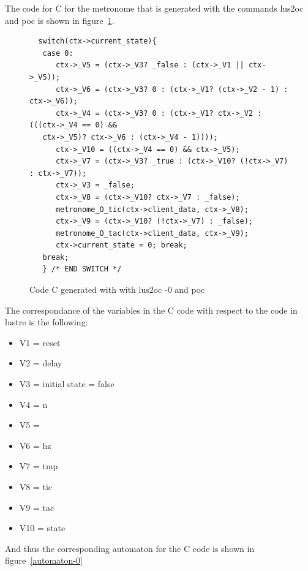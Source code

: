 \documentclass{article}
\begin{document}
The code for C for the metronome that is generated with the commands
lus2oc and poc is shown in figure~\ref{metronome-0}.


\begin{figure}[ht]

\begin{verbatim}
  switch(ctx->current_state){
   case 0:
      ctx->_V5 = (ctx->_V3? _false : (ctx->_V1 || ctx->_V5));
      ctx->_V6 = (ctx->_V3? 0 : (ctx->_V1? (ctx->_V2 - 1) : ctx->_V6));
      ctx->_V4 = (ctx->_V3? 0 : (ctx->_V1? ctx->_V2 : (((ctx->_V4 == 0) &&
   ctx->_V5)? ctx->_V6 : (ctx->_V4 - 1))));
      ctx->_V10 = ((ctx->_V4 == 0) && ctx->_V5);
      ctx->_V7 = (ctx->_V3? _true : (ctx->_V10? (!ctx->_V7) : ctx->_V7));
      ctx->_V3 = _false;
      ctx->_V8 = (ctx->_V10? ctx->_V7 : _false);
      metronome_O_tic(ctx->client_data, ctx->_V8);
      ctx->_V9 = (ctx->_V10? (!ctx->_V7) : _false);
      metronome_O_tac(ctx->client_data, ctx->_V9);
      ctx->current_state = 0; break;
   break;
   } /* END SWITCH */
\end{verbatim}
\label{metronome-0}
\caption{Code C generated with with lus2oc -0 and poc}
\end{figure}

The correspondance of the variables in the C code with
respect to the code in lustre is the following:

\begin{itemize}
\item V1 = reset
\item V2 = delay
\item V3 = initial state = false
\item V4 = n              
\item V5 =          
\item V6 = hz
\item V7 = tmp               
\item V8 = tic  
\item V9 = tac
\item V10 = state
\end{itemize}

And thus the corresponding automaton for the C code is shown
in figure~\ref{automaton-0}
\end{document}
